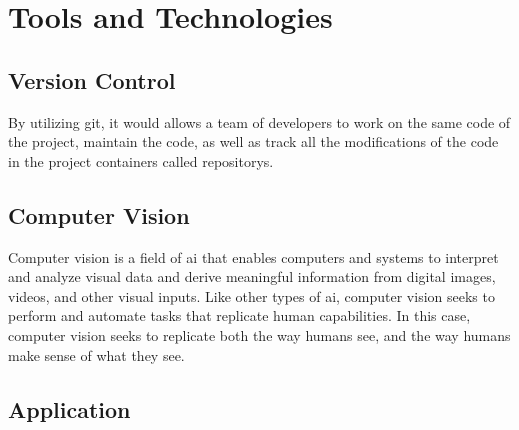 

\section{Tools and Technologies}

\subsection{Version Control}

By utilizing \gls{git}, it would allows a team of developers to work on the same code of the project, maintain the code, as well as track all the modifications of the code in the project containers called \glspl{repository}. \cite{alphaefficiency:git}

\subsection{Computer Vision}

Computer vision is a field of \gls{ai} that enables computers and systems to interpret and analyze visual data and derive meaningful information from digital images, videos, and other visual inputs. \cite{google:vision} Like other types of \gls{ai}, computer vision seeks to perform and automate tasks that replicate human capabilities. In this case, computer vision seeks to replicate both the way humans see, and the way humans make sense of what they see. \cite{microsoft:vision}

\subsection{Application}

